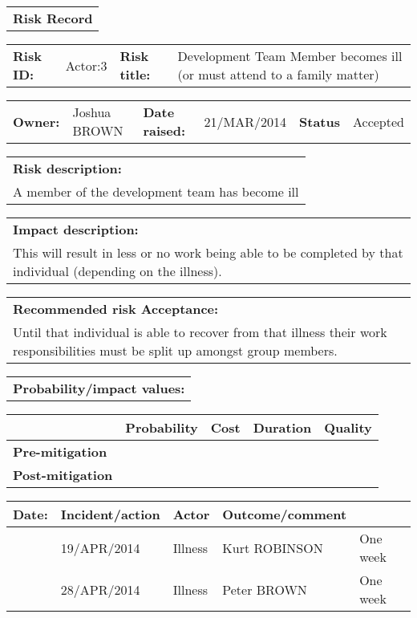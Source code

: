 \begin{table}
	\begin{tabularx}{\textwidth}{| X |}
		\hline
		\textbf{Risk Record} \\
	\end{tabularx}
	\begin{tabularx}{\textwidth}{| l | X | l | X |}
		\hline
		\textbf{Risk ID:} & Actor:3 & \textbf{Risk title:} & Development Team Member becomes ill (or must attend to a family matter) \\
	\end{tabularx}
	\begin{tabularx}{\textwidth}{| l | X | l | X | l | X |}
		\hline
		\textbf{Owner:} & Joshua BROWN & \textbf{Date raised:} & 21/MAR/2014 & \textbf{Status} & Accepted \\
	\end{tabularx}
	\begin{tabularx}{\textwidth}{| X |}
		\hline
		\textbf{Risk description:} \\ A member of the development team has become ill \\
	\end{tabularx}
	\begin{tabularx}{\textwidth}{| X |}
		\hline
		\textbf{Impact description:} \\ This will result in less or no work being able to be completed by that individual (depending on the illness). \\
	\end{tabularx}
	\begin{tabularx}{\textwidth}{| X |}
		\hline
		\textbf{Recommended risk Acceptance:} \\ Until that individual is able to recover from that illness their work responsibilities must be split up amongst group members. \\
	\end{tabularx}
	\begin{tabularx}{\textwidth}{| X |}
		\hline
		\textbf{Probability/impact values:} \\
	\end{tabularx}
	\begin{tabularx}{\textwidth}{| l | l | X | X | X |}
		\hline
		 &  \textbf{Probability} & \textbf{Cost} & \textbf{Duration} & \textbf{Quality} \\ \hline
		\textbf{Pre-mitigation} & & & & \\ \hline
		\textbf{Post-mitigation} & & & & \\ \hline \hline
	\end{tabularx}
	\begin{tabularx}{\textwidth}{| l | X | l | X |}
		\hline
		\textbf{Date:} & \textbf{Incident/action} & \textbf{Actor} & \textbf{Outcome/comment} \\ \hline
		 & 19/APR/2014 & Illness & Kurt ROBINSON & One week \\ \hline
		 & 28/APR/2014 & Illness & Peter BROWN & One week \\ \hline
	\end{tabularx}
\end{table}

